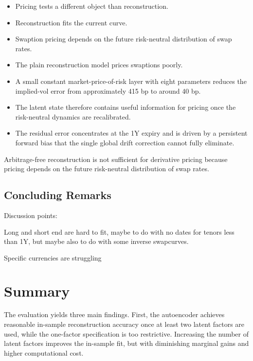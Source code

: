 \begin{itemize}
    \item Pricing tests a different object than reconstruction.
    \item Reconstruction fits the current curve.
    \item Swaption pricing depends on the future risk-neutral distribution of swap rates.
    \item The plain reconstruction model prices swaptions poorly.
    \item A small constant market-price-of-risk layer with eight parameters reduces the implied-vol error from approximately 415 bp to around 40 bp.
    \item The latent state therefore contains useful information for pricing once the risk-neutral dynamics are recalibrated.
    \item The residual error concentrates at the 1Y expiry and is driven by a persistent forward bias that the single global drift correction cannot fully eliminate.
\end{itemize}

Arbitrage-free reconstruction is not sufficient for derivative pricing because pricing depends on the future risk-neutral distribution of swap rates.



\subsection{Concluding Remarks}

Discussion points:

Long and short end are hard to fit, maybe to do with no dates for tenors less than 1Y, but maybe also to do with some inverse swapcurves.




Specific currencies are struggling


\section{Summary}

The evaluation yields three main findings. First, the autoencoder achieves reasonable in-sample reconstruction accuracy once at least two latent factors are used, while the one-factor specification is too restrictive. Increasing the number of latent factors improves the in-sample fit, but with diminishing marginal gains and higher computational cost.


